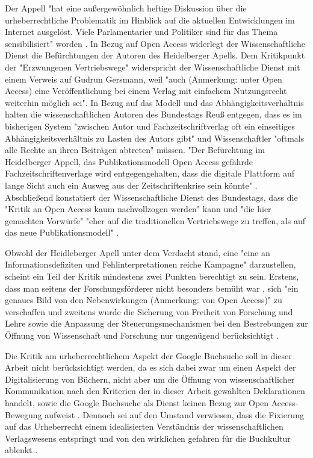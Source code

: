Der Appell "hat eine außergewöhnlich heftige Diskussion über die urheberrechtliche Problematik im Hinblick auf die aktuellen Entwicklungen im Internet ausgelöst. Viele Parlamentarier und Politiker sind für das Thema sensibilisiert" worden \cite{WD_bundestag_2009}. In Bezug auf Open Access widerlegt der Wissenschaftliche Dienst die Befürchtungen der Autoren des Heidelberger Apells. Dem Kritikpunkt der "Erzwungenen Vertriebswege" widerspricht der Wissenschaftliche Dienst mit einem Verweis auf Gudrun Gersmann, weil "auch (Anmerkung: unter Open Access) eine Veröffentlichung bei einem Verlag mit einfachem Nutzungsrecht weiterhin möglich sei". In Bezug auf das Modell und das Abhängigkeitsverhältnis halten die wissenschaftlichen Autoren des Bundestags Reuß entgegen, dass es im bisherigen System "zwischen Autor und Fachzeitschriftverlag oft ein einseitiges Abhängigkeitsverhältnis zu Lasten des Autors gibt" und Wissenschaftler "oftmals alle Rechte an ihren Beiträgen abtreten" \cite{WD_bundestag_2009} müssen. "Der Befürchtung im Heidelberger Appell, das Publikationsmodell Open Access gefährde Fachzeitschriftenverlage wird entgegengehalten, dass die digitale Plattform auf lange Sicht auch ein Ausweg aus der Zeitschriftenkrise sein könnte" \cite{WD_bundestag_2009}. Abschließend konstatiert der Wissenschaftliche Dienst des Bundestags, dass die "Kritik an Open Access kaum nachvollzogen werden" kann und "die hier gemachten Vorwürfe" "eher auf die traditionellen Vertriebswege zu treffen, als auf das neue Publikationsmodell" \cite{WD_bundestag_2009}.

Obwohl der Heidleberger Apell unter dem Verdacht stand, eine "eine an Informationsdefiziten und Fehlinterpretationen reiche Kampagne" \cite{Schmidt_2009} darzustellen, scheint ein Teil der Kritik  mindestens zwei Punkten berechtigt zu sein. Erstens, dass man seitens der Forschungsförderer nicht besonders bemüht war \cite{suchen}, sich "ein genaues Bild von den Nebenwirkungen (Anmerkung: von Open Access)" \cite{Reuss_2009} zu verschaffen und zweitens wurde die Sicherung von Freiheit von Forschung und Lehre sowie die Anpassung der Steuerungsmechanismen bei den Bestrebungen zur Öffnung von Wissenschaft und Forschung nur ungenügend berücksichtigt \cite{hagner_2015_sache_buches}.

Die Kritik am urheberrechtlichem Aspekt der Google Buchsuche soll in dieser Arbeit nicht berücksichtigt werden, da es sich dabei zwar um einen Aspekt der Digitalisierung von Büchern, nicht aber um die Öffnung von wissenschaftlicher Kommunikation nach den Kriterien der in dieser Arbeit gewählten Deklarationen handelt, sowie die Google Buchsuche als Dienst keinen Bezug zur Open Access-Bewegung aufweist \cite{hagner_2015_sache_buches}. Dennoch sei auf den Umstand verwiesen, dass die Fixierung auf das Urheberrecht einem idealisierten Verständnis der wissenschaftlichen Verlagswesens entspringt und von den wirklichen gefahren für die Buchkultur ablenkt \cite{Hirschi_2015_buch_oa}.

